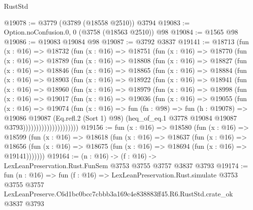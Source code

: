 \begin{lexlean}{RustStd}
\begin{coremodule}
@19078 := @3779 (@3789 (@18558 @2510)) @3794
@19083 := Option.noConfusion.{0, 0} (@3758 (@18563 @2510)) @98
@19084 := @1565 @98
@19086 := @19083 @19084 @98
@19087 := @3792 @3837
@19141 := @18713
    (fun (x : @16) =>
    @18732
      (fun (x : @16) =>
      @18751
        (fun (x : @16) =>
        @18770
          (fun (x : @16) =>
          @18789
            (fun (x : @16) =>
            @18808
              (fun (x : @16) =>
              @18827
                (fun (x : @16) =>
                @18846
                  (fun (x : @16) =>
                  @18865
                    (fun (x : @16) =>
                    @18884
                      (fun (x : @16) =>
                      @18903
                        (fun (x : @16) =>
                        @18922
                          (fun (x : @16) =>
                          @18941
                            (fun (x : @16) =>
                            @18960
                              (fun (x : @16) =>
                              @18979
                                (fun (x : @16) =>
                                @18998
                                  (fun (x : @16) =>
                                  @19017
                                    (fun (x : @16) =>
                                    @19036
                                      (fun (x : @16) =>
                                      @19055
                                        (fun (x : @16) =>
                                        @19074
                                          (fun (x : @16) =>
                                          fun (fn : @98) =>
                                          fun (h : @19078) =>
                                          @19086
                                            @19087
                                            (Eq.refl.{2} (Sort 1) @98)
                                            (heq_of_eq.{1}
                                              @3778
                                              @19084
                                              @19087
                                              @3793)))))))))))))))))))))
@19156 := fun (x : @16) =>
  @18580
    (fun (x : @16) =>
    @18599
      (fun (x : @16) =>
      @18618
        (fun (x : @16) =>
        @18637
          (fun (x : @16) =>
          @18656 (fun (x : @16) => @18675 (fun (x : @16) => @18694 (fun (x : @16) => @19141)))))))
@19164 := (n : @16) -> (f : @16) -> LexLeanPreservation.Rust.FunSem @3753 @3755 @3757 @3837 @3793
@19174 := fun (n : @16) =>
  fun (f : @16) =>
  LexLeanPreservation.Rust.simulate
    @3753
    @3755
    @3757
    LexLeanPreserve.C6d1bc0bcc7cbbb3a169c4e838883ff45.R6.RustStd.crate_ok
    @3837
    @3793
\end{coremodule}
\end{lexlean}
